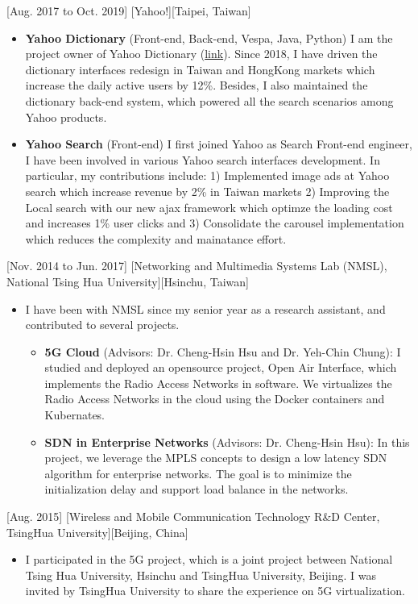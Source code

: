 \documentclass{article}
\begin{document}
[Aug. 2017 to Oct. 2019]
[Yahoo!][Taipei, Taiwan]
\begin{itemize}
\item \textbf{Yahoo Dictionary} (Front-end, Back-end, Vespa, Java, Python) I am the project owner of Yahoo Dictionary (\href{https://tw.dictionary.search.yahoo.com/}{link}). Since 2018, I have driven the dictionary interfaces redesign in Taiwan and HongKong markets which increase the daily active users by 12\%. Besides, I also maintained the dictionary back-end system, which powered all the search scenarios among Yahoo products.
\item \textbf{Yahoo Search} (Front-end) I first joined Yahoo as Search Front-end engineer, I have been involved in various Yahoo search interfaces development. In particular, my contributions include: 1) Implemented image ads at Yahoo search which increase revenue by 2\% in Taiwan markets 2) Improving the Local search with our new ajax framework which optimze the loading cost and increases 1\% user clicks and 3) Consolidate the carousel implementation which reduces the complexity and mainatance effort.
\end{itemize}

[Nov. 2014 to Jun. 2017]
[Networking and Multimedia Systems Lab (NMSL), National Tsing Hua University][Hsinchu, Taiwan]
\begin{itemize}
\item I have been with NMSL since my senior year as a research assistant, and contributed to several projects. \begin{itemize}
\item \textbf{5G Cloud} (Advisors: Dr. Cheng-Hsin Hsu and Dr. Yeh-Chin Chung):  I studied and deployed an opensource project, Open Air Interface, which implements the Radio Access Networks in software. We virtualizes the Radio Access Networks in the cloud using the Docker containers and Kubernates.
\item \textbf{SDN in Enterprise Networks} (Advisors:  Dr. Cheng-Hsin Hsu): In this project, we leverage the MPLS concepts to design a low latency SDN algorithm for enterprise networks. The goal is to minimize the initialization delay and support load balance in the networks.
\end{itemize}
\end{itemize}

[Aug. 2015]
[Wireless and Mobile Communication Technology R\&D Center, TsingHua University][Beijing, China]
\begin{itemize}
\item I participated in the 5G project, which is a joint project between National Tsing Hua University, Hsinchu and TsingHua University, Beijing. I was invited by TsingHua
University to share the experience on 5G virtualization.
\end{itemize}
\end{document}
